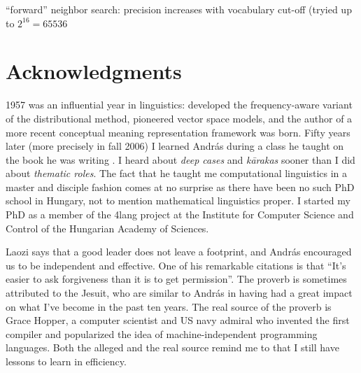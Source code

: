\documentclass[11pt]{article}
\begin{document}
``forward'' neighbor search: precision increases with vocabulary cut-off
(tryied up to $2^16=65536$


\section{Acknowledgments}

1957 was an influential year in linguistics: \cite{Harris:1957} developed the
frequency-aware variant of the distributional method, \cite{Osgood:1957}
pioneered vector space models, and the author of a more recent conceptual
meaning representation framework \citep{Kornai:2010,Kornai:2017} was born.
Fifty years later (more precisely in fall 2006) I learned András during a class
he taught on the book he was writing \citep{Kornai:2007}. I heard about
\emph{deep cases} and \emph{k\={a}rakas} sooner than I did about \emph{thematic
roles}. The fact that he taught me computational linguistics in a master and
disciple fashion comes at no surprise as there have been no such PhD school in
Hungary, not to mention mathematical linguistics proper.  
I started my PhD as a member of the 4lang project at the Institute for Computer
Science and Control of the Hungarian Academy of Sciences. 

Laozi says that a good leader does not leave a footprint, and András encouraged
us to be independent and effective. One of his remarkable citations is that
``It's easier to ask forgiveness than it is to get permission''. The proverb is
sometimes attributed to the Jesuit, who are similar to András in having had a
great impact on what I've become in the past ten years. The real source of the
proverb is Grace Hopper, a computer scientist and US navy admiral who invented
the first compiler and popularized the idea of machine-independent programming
languages. Both the alleged and the real source remind me to that I still have
lessons to learn in efficiency.


 
  
\end{document}
